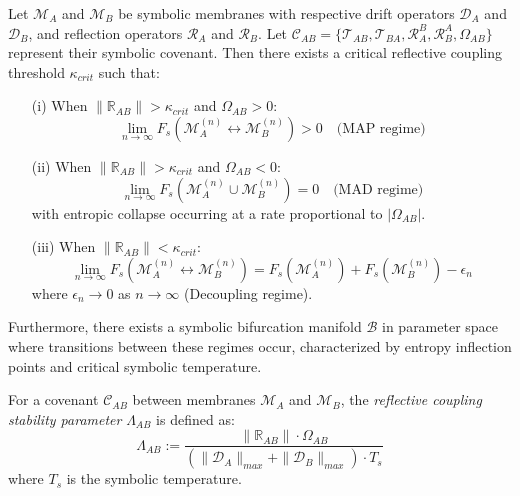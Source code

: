\begin{theorem}
\label{theorem:bk5_enhanced_map_mad_duality}
Let $\mathscr{M}_A$ and $\mathscr{M}_B$ be symbolic membranes with respective drift operators $\mathcal{D}_A$ and $\mathcal{D}_B$, and reflection operators $\mathcal{R}_A$ and $\mathcal{R}_B$. Let $\mathcal{C}_{AB} = \{\mathcal{T}_{AB}, \mathcal{T}_{BA}, \mathcal{R}_A^B, \mathcal{R}_B^A, \Omega_{AB}\}$ represent their symbolic covenant. Then there exists a critical reflective coupling threshold $\kappa_{crit}$ such that:
\begin{enumerate}
  \item[(i)] When $\|\mathbb{R}_{AB}\| > \kappa_{crit}$ and $\Omega_{AB} > 0$:
  \begin{equation}
  \lim_{n \to \infty} F_s(\mathscr{M}_A^{(n)} \leftrightarrow \mathscr{M}_B^{(n)}) > 0 \quad \text{(MAP regime)}
  \end{equation}
  \item[(ii)] When $\|\mathbb{R}_{AB}\| > \kappa_{crit}$ and $\Omega_{AB} < 0$:
  \begin{equation}
  \lim_{n \to \infty} F_s(\mathscr{M}_A^{(n)} \cup \mathscr{M}_B^{(n)}) = 0 \quad \text{(MAD regime)}
  \end{equation}
  with entropic collapse occurring at a rate proportional to $|\Omega_{AB}|$.
  \item[(iii)] When $\|\mathbb{R}_{AB}\| < \kappa_{crit}$:
  \begin{equation}
  \lim_{n \to \infty} F_s(\mathscr{M}_A^{(n)} \leftrightarrow \mathscr{M}_B^{(n)}) = F_s(\mathscr{M}_A^{(n)}) + F_s(\mathscr{M}_B^{(n)}) - \epsilon_n
  \end{equation}
  where $\epsilon_n \to 0$ as $n \to \infty$ (Decoupling regime).
\end{enumerate}
Furthermore, there exists a symbolic bifurcation manifold $\mathcal{B}$ in parameter space where transitions between these regimes occur, characterized by entropy inflection points and critical symbolic temperature.
\end{theorem}
\begin{definition} \label{definition:bk5_reflective_coupling_stab} 

For a covenant $\mathcal{C}_{AB}$ between membranes $\mathscr{M}_A$ and $\mathscr{M}_B$, the \emph{reflective coupling stability parameter} $\Lambda_{AB}$ is defined as:
\begin{equation}
\Lambda_{AB} := \frac{\|\mathbb{R}_{AB}\| \cdot \Omega_{AB}}{(\|\mathcal{D}_A\|_{max} + \|\mathcal{D}_B\|_{max}) \cdot T_s}
\end{equation}
\noindent where $T_s$ is the symbolic temperature.
\end{definition}

